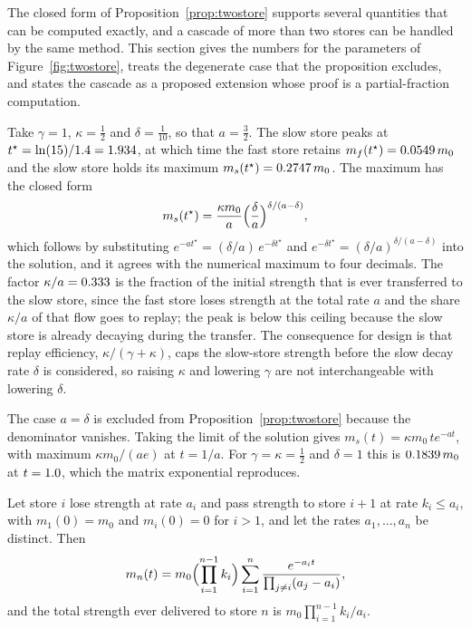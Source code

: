 The closed form of Proposition~\ref{prop:twostore} supports several quantities that can be computed exactly, and a cascade of more than two stores can be handled by the same method. This section gives the numbers for the parameters of Figure~\ref{fig:twostore}, treats the degenerate case that the proposition excludes, and states the cascade as a proposed extension whose proof is a partial-fraction computation.

\begin{workedex}\label{ex:twostore27}
Take $\gamma=1$, $\kappa=\tfrac12$ and $\delta=\tfrac1{10}$, so that $a=\tfrac32$. The slow store peaks at $t^\star=\ln(15)/1.4=1.934$, at which time the fast store retains $m_f(t^\star)=0.0549\,m_0$ and the slow store holds its maximum $m_s(t^\star)=0.2747\,m_0$. The maximum has the closed form
\begin{equation}
m_s(t^\star)=\frac{\kappa m_0}{a}\Bigl(\frac{\delta}{a}\Bigr)^{\delta/(a-\delta)},
\end{equation}
which follows by substituting $e^{-at^\star}=(\delta/a)\,e^{-\delta t^\star}$ and $e^{-\delta t^\star}=(\delta/a)^{\delta/(a-\delta)}$ into the solution, and it agrees with the numerical maximum to four decimals. The factor $\kappa/a=0.333$ is the fraction of the initial strength that is ever transferred to the slow store, since the fast store loses strength at the total rate $a$ and the share $\kappa/a$ of that flow goes to replay; the peak is below this ceiling because the slow store is already decaying during the transfer. The consequence for design is that replay efficiency, $\kappa/(\gamma+\kappa)$, caps the slow-store strength before the slow decay rate $\delta$ is considered, so raising $\kappa$ and lowering $\gamma$ are not interchangeable with lowering $\delta$.

The case $a=\delta$ is excluded from Proposition~\ref{prop:twostore} because the denominator vanishes. Taking the limit of the solution gives $m_s(t)=\kappa m_0\,te^{-at}$, with maximum $\kappa m_0/(ae)$ at $t=1/a$. For $\gamma=\kappa=\tfrac12$ and $\delta=1$ this is $0.1839\,m_0$ at $t=1.0$, which the matrix exponential reproduces.
\end{workedex}

\begin{extension}\label{ext:cascade27}
Let store $i$ lose strength at rate $a_i$ and pass strength to store $i+1$ at rate $k_i\le a_i$, with $m_1(0)=m_0$ and $m_i(0)=0$ for $i>1$, and let the rates $a_1,\dots,a_n$ be distinct. Then
\begin{equation}
m_n(t)=m_0\Bigl(\prod_{i=1}^{n-1}k_i\Bigr)\sum_{i=1}^n\frac{e^{-a_it}}{\prod_{j\ne i}(a_j-a_i)},
\end{equation}
and the total strength ever delivered to store $n$ is $m_0\prod_{i=1}^{n-1}k_i/a_i$.
\end{extension}

